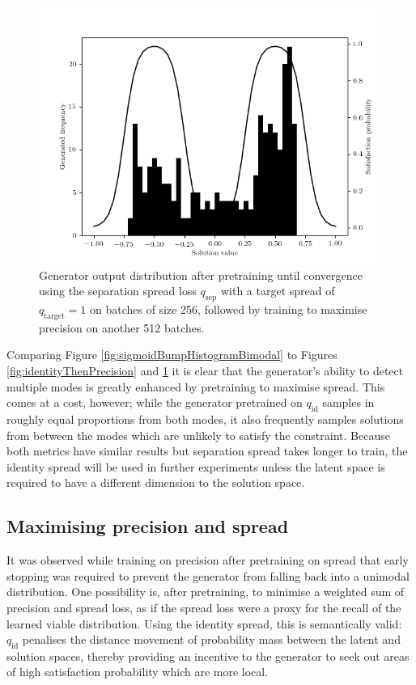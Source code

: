 \documentclass[../../main.tex]{subfiles}
\begin{document}
\begin{figure}[H]
    \begin{center}
    \includegraphics[width=\textwidth]{separationThenPrecision}
    \caption{
        Generator output distribution after pretraining until convergence using the separation spread loss $q_\text{sep}$ with a target spread of $q_\text{target} = 1$ on batches of size 256, followed by training to maximise precision on another 512 batches.
    }
    \label{fig:separationThenPrecision}
    \end{center}
\end{figure}
Comparing Figure \ref{fig:sigmoidBumpHistogramBimodal} to Figures \ref{fig:identityThenPrecision} and \ref{fig:separationThenPrecision} it is clear that the generator's ability to detect multiple modes is greatly enhanced by pretraining to maximise spread.
This comes at a cost, however; while the generator pretrained on $q_\text{id}$ samples in roughly equal proportions from both modes, it also frequently samples solutions from between the modes which are unlikely to satisfy the constraint.
Because both metrics have similar results but separation spread takes longer to train, the identity spread will be used in further experiments unless the latent space is required to have a different dimension to the solution space.

\subsection{Maximising precision and spread}

It was observed while training on precision after pretraining on spread that early stopping was required to prevent the generator from falling back into a unimodal distribution.
One possibility is, after pretraining, to minimise a weighted sum of precision and spread loss, as if the spread loss were a proxy for the recall of the learned viable distribution.
Using the identity spread, this is semantically valid: $q_\text{id}$ penalises the distance movement of probability mass between the latent and solution spaces, thereby providing an incentive to the generator to seek out areas of high satisfaction probability which are more local.
\end{document}

